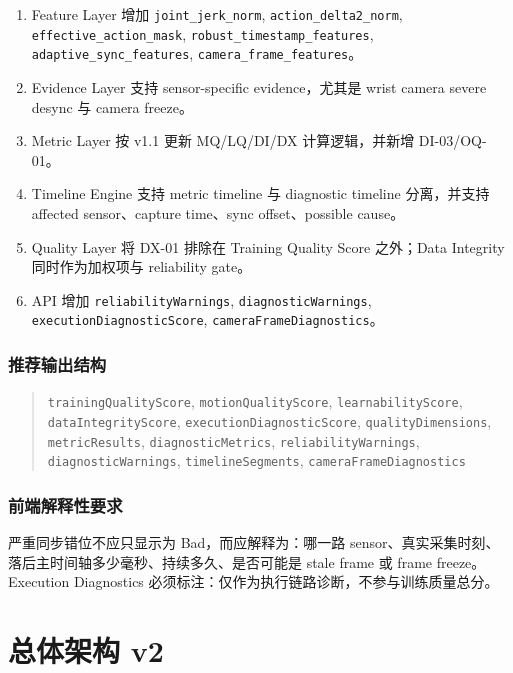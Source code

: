 \documentclass[UTF8,zihao=-4,oneside,openany]{ctexrep}
\newcommand{\Code}[1]{\texttt{#1}}
\begin{document}
\begin{enumerate}
\item Feature Layer 增加 \Code{joint\_jerk\_norm}, \Code{action\_delta2\_norm}, \Code{effective\_action\_mask}, \Code{robust\_timestamp\_features}, \Code{adaptive\_sync\_features}, \Code{camera\_frame\_features}。
\item Evidence Layer 支持 sensor-specific evidence，尤其是 wrist camera severe desync 与 camera freeze。
\item Metric Layer 按 v1.1 更新 MQ/LQ/DI/DX 计算逻辑，并新增 DI-03/OQ-01。
\item Timeline Engine 支持 metric timeline 与 diagnostic timeline 分离，并支持 affected sensor、capture time、sync offset、possible cause。
\item Quality Layer 将 DX-01 排除在 Training Quality Score 之外；Data Integrity 同时作为加权项与 reliability gate。
\item API 增加 \Code{reliabilityWarnings}, \Code{diagnosticWarnings}, \Code{executionDiagnosticScore}, \Code{cameraFrameDiagnostics}。
\end{enumerate}

\subsection*{推荐输出结构}

\begin{quote}\small
\Code{trainingQualityScore}, \Code{motionQualityScore}, \Code{learnabilityScore}, \Code{dataIntegrityScore}, \Code{executionDiagnosticScore}, \Code{qualityDimensions}, \Code{metricResults}, \Code{diagnosticMetrics}, \Code{reliabilityWarnings}, \Code{diagnosticWarnings}, \Code{timelineSegments}, \Code{cameraFrameDiagnostics}
\end{quote}

\subsection*{前端解释性要求}

严重同步错位不应只显示为 Bad，而应解释为：哪一路 sensor、真实采集时刻、落后主时间轴多少毫秒、持续多久、是否可能是 stale frame 或 frame freeze。Execution Diagnostics 必须标注：仅作为执行链路诊断，不参与训练质量总分。

\clearpage

\chapter{总体架构 v2}
\end{document}
